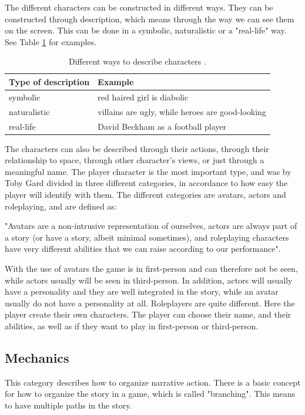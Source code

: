 The different characters can be constructed in different ways. They can be constructed through description, which means through the way we can see them on the screen. This can be done in a symbolic, naturalistic or a "real-life" way. See Table \ref{tab:description} for examples.

\begin{table}
\centering
    \begin{tabular}{|l|l|}
        \hline
        \textbf{Type of description} & \textbf{Example} \\ \hline
       symbolic & red haired girl is diabolic  \\ \hline
       naturalistic & villains are ugly, while heroes are good-looking \\ \hline
       real-life & David Beckham as a football player \\ \hline
    \end{tabular}
    \caption[Different ways to describe characters]{Different ways to describe characters \cite{understandingvg}.}
    \label{tab:description}
\end{table} 

The characters can also be described through their actions, through their relationship to space, through other character’s views, or just through a meaningful name. The player character is the most important type, and was by Toby Gard divided in three different categories, in accordance to how easy the player will identify with them. The different categories are avatars, actors and roleplaying, and are defined as:

"Avatars are a non-intrusive representation of ourselves, actors are always part of a story (or have a story, albeit minimal sometimes), and roleplaying characters have very different abilities that we can raise according to our performance". \cite{understandingvg}

With the use of avatars the game is in first-person and can therefore not be seen, while actors usually will be seen in third-person. In addition, actors will usually have a personality and they are well integrated in the story, while an avatar usually do not have a personality at all. Roleplayers are quite different. Here the player create their own characters. The player can choose their name, and their abilities, as well as if they want to play in first-person or third-person.  

\subsection{Mechanics}
This category describes how to organize narrative action. There is a basic concept for how to organize the story in a game, which is called "branching". This means to have multiple paths in the story. 


